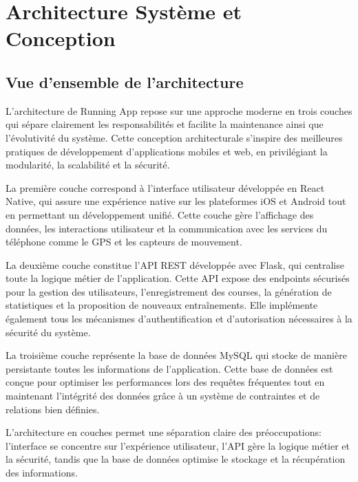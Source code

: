 \section{Architecture Système et Conception}

\subsection{Vue d'ensemble de l'architecture}

L'architecture de Running App repose sur une approche moderne en trois couches qui sépare clairement les responsabilités et facilite la maintenance ainsi que l'évolutivité du système. Cette conception architecturale s'inspire des meilleures pratiques de développement d'applications mobiles et web, en privilégiant la modularité, la scalabilité et la sécurité.

La première couche correspond à l'interface utilisateur développée en React Native, qui assure une expérience native sur les plateformes iOS et Android tout en permettant un développement unifié. Cette couche gère l'affichage des données, les interactions utilisateur et la communication avec les services du téléphone comme le GPS et les capteurs de mouvement.

La deuxième couche constitue l'API REST développée avec Flask, qui centralise toute la logique métier de l'application. Cette API expose des endpoints sécurisés pour la gestion des utilisateurs, l'enregistrement des courses, la génération de statistiques et la proposition de nouveaux entraînements. Elle implémente également tous les mécanismes d'authentification et d'autorisation nécessaires à la sécurité du système.

La troisième couche représente la base de données MySQL qui stocke de manière persistante toutes les informations de l'application. Cette base de données est conçue pour optimiser les performances lors des requêtes fréquentes tout en maintenant l'intégrité des données grâce à un système de contraintes et de relations bien définies.

\begin{infobox}
L'architecture en couches permet une séparation claire des préoccupations: l'interface se concentre sur l'expérience utilisateur, l'API gère la logique métier et la sécurité, tandis que la base de données optimise le stockage et la récupération des informations.
\end{infobox}


